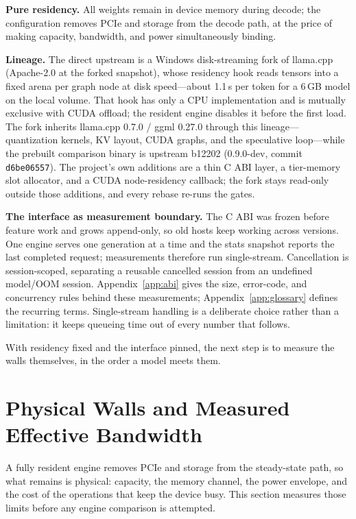 \documentclass[letterpaper,twocolumn,10pt]{article}
\begin{document}
\textbf{Pure residency.} All weights remain in device memory during decode;
the configuration removes PCIe and storage from the decode path, at the price
of making capacity, bandwidth, and power simultaneously binding.

\textbf{Lineage.} The direct upstream is a Windows disk-streaming fork of
llama.cpp~\cite{llamacpp,diskinfer} (Apache-2.0 at the forked snapshot), whose
residency hook reads tensors into a fixed arena per graph node at disk
speed---about 1.1\,s per token for a 6\,GB model on the local volume. That hook
has only a CPU implementation and is mutually exclusive with CUDA offload; the
resident engine disables it before the first load. The fork inherits llama.cpp
0.7.0 / ggml 0.27.0 through this lineage---quantization kernels, KV layout,
CUDA graphs, and the speculative loop---while the prebuilt comparison binary is
upstream b12202 (0.9.0-dev, commit \texttt{d6be06557}). The project's own
additions are a thin C ABI layer, a tier-memory slot allocator, and a CUDA
node-residency callback; the fork stays read-only outside those additions, and
every rebase re-runs the gates.

\textbf{The interface as measurement boundary.} The C ABI was frozen before
feature work and grows append-only, so old hosts keep working across versions. One
engine serves one generation at a time and the stats snapshot reports the last
completed request; measurements therefore run single-stream. Cancellation is
session-scoped, separating a reusable cancelled session from an undefined
model/OOM session. Appendix~\ref{app:abi} gives the size, error-code, and
concurrency rules behind these measurements; Appendix~\ref{app:glossary}
defines the recurring terms. Single-stream handling is a deliberate choice
rather than a limitation: it keeps queueing time out of every number that
follows.

With residency fixed and the interface pinned, the next step is to measure the
walls themselves, in the order a model meets them.

\section{Physical Walls and Measured Effective Bandwidth}

A fully resident engine removes PCIe and storage from the steady-state path,
so what remains is physical: capacity, the memory channel, the power envelope,
and the cost of the operations that keep the device busy. This section measures
those limits before any engine comparison is attempted.
\end{document}
